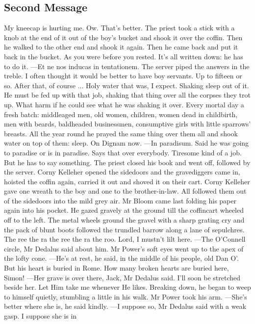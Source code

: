 \documentclass{article}
\begin{document}
\subsection{Second Message}
My kneecap is hurting me. Ow. That’s better.
The priest took a stick with a knob at the end of it out of the boy’s
bucket and shook it over the coffin. Then he walked to the other end and
shook it again. Then he came back and put it back in the bucket. As you
were before you rested. It’s all written down: he has to do it.
—Et ne nos inducas in tentationem.
The server piped the answers in the treble. I often thought it would be
better to have boy servants. Up to fifteen or so. After that, of course
...
Holy water that was, I expect. Shaking sleep out of it. He must be fed
up with that job, shaking that thing over all the corpses they trot up.
What harm if he could see what he was shaking it over. Every mortal
day a fresh batch: middleaged men, old women, children, women dead in
childbirth, men with beards, baldheaded businessmen, consumptive girls
with little sparrows’ breasts. All the year round he prayed the same
thing over them all and shook water on top of them: sleep. On Dignam
now.
—In paradisum.
Said he was going to paradise or is in paradise. Says that over
everybody. Tiresome kind of a job. But he has to say something.
The priest closed his book and went off, followed by the server. Corny
Kelleher opened the sidedoors and the gravediggers came in, hoisted the
coffin again, carried it out and shoved it on their cart. Corny Kelleher
gave one wreath to the boy and one to the brother-in-law. All followed
them out of the sidedoors into the mild grey air. Mr Bloom came last
folding his paper again into his pocket. He gazed gravely at the ground
till the coffincart wheeled off to the left. The metal wheels ground the
gravel with a sharp grating cry and the pack of blunt boots followed the
trundled barrow along a lane of sepulchres.
The ree the ra the ree the ra the roo. Lord, I mustn’t lilt here.
—The O’Connell circle, Mr Dedalus said about him.
Mr Power’s soft eyes went up to the apex of the lofty cone.
—He’s at rest, he said, in the middle of his people, old Dan O’.
But his heart is buried in Rome. How many broken hearts are buried here,
Simon!
—Her grave is over there, Jack, Mr Dedalus said. I’ll soon be
stretched beside her. Let Him take me whenever He likes.
Breaking down, he began to weep to himself quietly, stumbling a little
in his walk. Mr Power took his arm.
—She’s better where she is, he said kindly.
—I suppose so, Mr Dedalus said with a weak gasp. I suppose she is in
\end{document}
